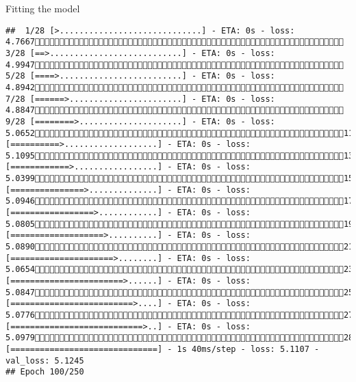 \documentclass[
  ignorenonframetext,
]{beamer}
\begin{document}
\begin{frame}[fragile]{Fitting the model}
\begin{verbatim}
##  1/28 [>.............................] - ETA: 0s - loss: 4.7667 3/28 [==>...........................] - ETA: 0s - loss: 4.9947 5/28 [====>.........................] - ETA: 0s - loss: 4.8942 7/28 [======>.......................] - ETA: 0s - loss: 4.8847 9/28 [========>.....................] - ETA: 0s - loss: 5.065211/28 [==========>...................] - ETA: 0s - loss: 5.109513/28 [============>.................] - ETA: 0s - loss: 5.039915/28 [===============>..............] - ETA: 0s - loss: 5.094617/28 [=================>............] - ETA: 0s - loss: 5.080519/28 [===================>..........] - ETA: 0s - loss: 5.089021/28 [=====================>........] - ETA: 0s - loss: 5.065423/28 [=======================>......] - ETA: 0s - loss: 5.084725/28 [=========================>....] - ETA: 0s - loss: 5.077627/28 [===========================>..] - ETA: 0s - loss: 5.097928/28 [==============================] - 1s 40ms/step - loss: 5.1107 - val_loss: 5.1245
## Epoch 100/250

\end{verbatim}
\end{frame}
\end{document}
